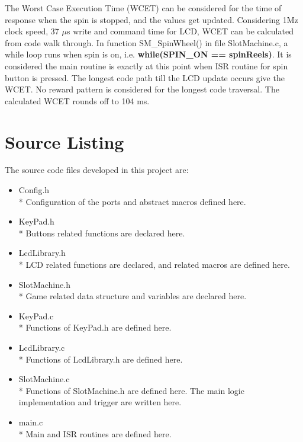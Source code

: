 \documentclass[a4paper,13pt,openany,sffamily]{memoir}
\begin{document}


The Worst Case Execution Time (WCET) can be considered for the time of response when the spin is stopped, and the values get updated. Considering 1Mz clock speed, 37 \(\mu\)s write and command time for LCD, WCET can be calculated from code walk through. In function SM\_SpinWheel() in file SlotMachine.c, a while loop runs when spin is on, i.e. \textbf{while(SPIN\_ON == spinReels)}. It is considered the main routine is exactly at this point when ISR routine for spin button is pressed. The longest code path till the LCD update occurs give the WCET. No reward pattern is considered for the longest code traversal. The calculated WCET rounds off to 104 ms.


\chapter {Source Listing}

 The source code files developed in this project are:
\begin{itemize}
\item Config.h \\*
    Configuration of the ports and abstract macros defined here.
\item KeyPad.h \\*
    Buttons related functions are declared here.
\item LcdLibrary.h \\*
    LCD related functions are declared, and related macros are defined here.
    
\item SlotMachine.h \\*
    Game related data structure and variables are declared here.
\item KeyPad.c \\*
    Functions of KeyPad.h are defined here.
\item LcdLibrary.c \\*
    Functions of LcdLibrary.h are defined here.
\item SlotMachine.c \\*
    Functions of SlotMachine.h are defined here. The main logic implementation and trigger are written here.
\item main.c \\*
    Main and ISR routines are defined here.
    
\end{itemize}
\end{document}
